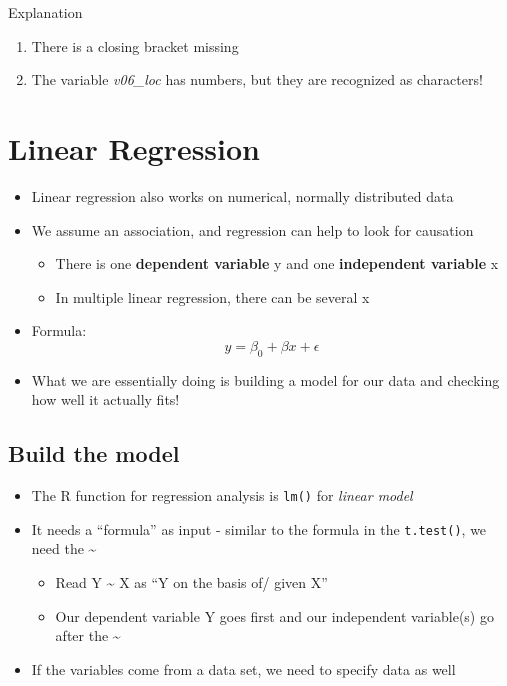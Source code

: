 \documentclass[
]{book}
\providecommand{\tightlist}{%
  \setlength{\itemsep}{0pt}\setlength{\parskip}{0pt}}
\begin{document}
Explanation

\begin{enumerate}
\def\labelenumi{\arabic{enumi}.}
\tightlist
\item
  There is a closing bracket missing
\item
  The variable \emph{v06\_loc} has numbers, but they are recognized as characters!
\end{enumerate}

\section{Linear Regression}\label{linear-regression}

\begin{itemize}
\tightlist
\item
  Linear regression also works on numerical, normally distributed data
\item
  We assume an association, and regression can help to look for causation

  \begin{itemize}
  \tightlist
  \item
    There is one \textbf{dependent variable} y and one \textbf{independent variable} x
  \item
    In multiple linear regression, there can be several x
  \end{itemize}
\item
  Formula: \[ y = \beta_0 + \beta x + \epsilon \]
\item
  What we are essentially doing is building a model for our data and checking how well it actually fits!
\end{itemize}

\subsection{Build the model}\label{build-the-model}

\begin{itemize}
\tightlist
\item
  The R function for regression analysis is \texttt{lm()} for \emph{linear model}
\item
  It needs a ``formula'' as input - similar to the formula in the \texttt{t.test()}, we need the \textasciitilde{}

  \begin{itemize}
  \tightlist
  \item
    Read Y \textasciitilde{} X as ``Y on the basis of/ given X''
  \item
    Our dependent variable Y goes first and our independent variable(s) go after the \textasciitilde{}
  \end{itemize}
\item
  If the variables come from a data set, we need to specify data as well
\end{itemize}
\end{document}
